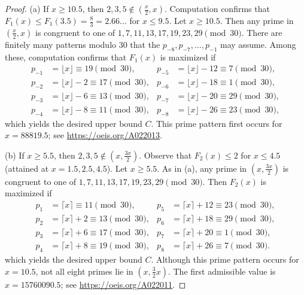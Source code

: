 \documentclass[10pt,a4paper]{amsart}
\theoremstyle{plain}
\newcommand{\ceiling}[1]{\lceil #1 \rceil}
\newcommand{\floor}[1]{\lfloor #1 \rfloor}
\begin{document}
\begin{proof}
    (a) If $x \geq 10.5$, then $2,3,5 \notin (\frac{x}{2},x)$.  Computation confirms that
    $F_1(x) \leq F_1(3.5) = \frac{8}{3} =2.66\ldots$ for $x \leq 9.5$.  Let $x \geq 10.5$.
    Then any prime in $(\frac{x}{2},x)$ is 
    congruent to one of $1, 7, 11, 13, 17, 19, 23, 29 \pmod{30}$.  
    There are finitely many patterns modulo $30$ that the $p_{-8},p_{-7},\ldots,p_{-1}$ may assume.
    Among these, computation confirms that $F_1(x)$ is maximized if 
    \begin{align*}
        p_{-1} &= \floor{x} \equiv 19\pmod{30},  & p_{-5} &= \floor{x}-12 \equiv 7\pmod{30},\\
        p_{-2} &= \floor{x}-2 \equiv 17\pmod{30},  & p_{-6} &= \floor{x}-18 \equiv 1\pmod{30},\\
        p_{-3} &= \floor{x}-6 \equiv 13\pmod{30},  & p_{-7} &= \floor{x}-20 \equiv 29\pmod{30},\\
        p_{-4} &= \floor{x}-8 \equiv 11\pmod{30},  & p_{-8} &= \floor{x}-26 \equiv 23\pmod{30},
    \end{align*}
    which yields the desired upper bound $C$.
    This prime pattern first occurs for $x = 88819.5$;
    see \url{https://oeis.org/A022013}.
        
    \medskip\noindent(b) If $x \geq 5.5$, then $2,3,5 \notin (x, \frac{3x}{2})$.  Observe that
    $F_2(x) \leq 2$ for $x \leq 4.5$ (attained at $x=1.5, 2.5, 4.5$).  Let $x \geq 5.5$.
    As in (a), any prime in $(x,\frac{3x}{2})$ is 
    congruent to one of $1, 7, 11, 13, 17, 19, 23, 29 \pmod{30}$.  
    Then $F_2(x)$ is maximized if 
    \begin{align*}
        p_{1} &= \ceiling{x} \equiv 11\pmod{30},  & p_{5} &= \ceiling{x}+12 \equiv 23\pmod{30},\\
        p_{2} &= \ceiling{x}+2 \equiv 13\pmod{30},  & p_{6} &= \ceiling{x}+18 \equiv 29\pmod{30},\\
        p_{3} &= \ceiling{x}+6 \equiv 17\pmod{30},  & p_{7} &= \ceiling{x}+20 \equiv 1\pmod{30}, \\
        p_{4} &= \ceiling{x}+8 \equiv 19\pmod{30}, & p_8 &= \ceiling{x} + 26 \equiv 7 \pmod{30}.
    \end{align*}
    which yields the desired upper bound $C$.
    Although this prime pattern occurs for $x=10.5$, not all eight primes lie in $(x,\frac{3}{2}x)$.    
    The first admissible value is $x = 15760090.5$; see \url{https://oeis.org/A022011}.
\end{proof}
\end{document}
